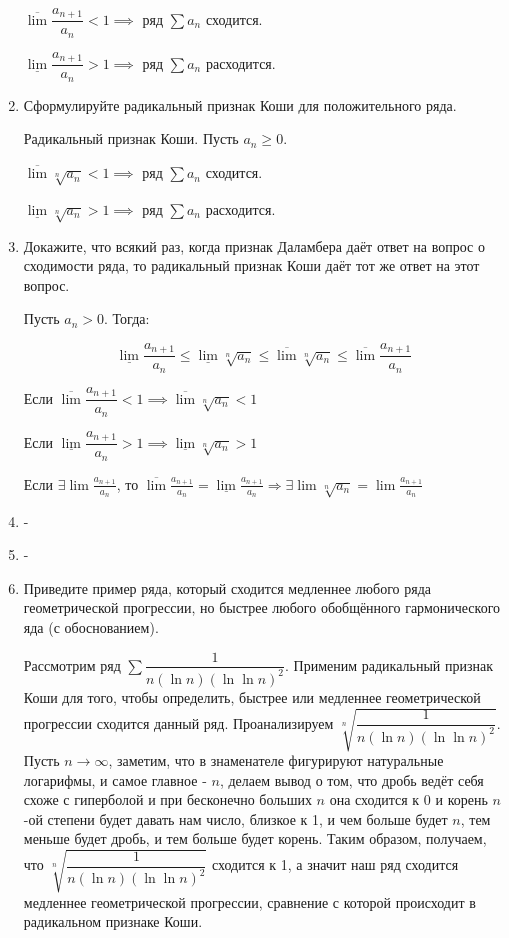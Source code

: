 \documentclass[a4paper]{article}
\begin{document}
\begin{enumerate}
\begin{theorem}
            $\overline{\lim} \dfrac{a_{n+1}}{a_n} < 1 \implies $ ряд $\sum a_n$ сходится.
            
            $\underline{\lim} \dfrac{a_{n+1}}{a_n} > 1 \implies $ ряд $\sum a_n$ расходится.
        \end{theorem}
        \item Сформулируйте радикальный признак Коши для положительного ряда.
        \begin{theorem}
            Радикальный признак Коши. Пусть $a_n \geq 0$.
            
            $\overline{\lim} \sqrt[n]{a_n} < 1 \implies$ ряд $\sum a_n$ сходится.
             
            $\underline{\lim} \sqrt[n]{a_n} > 1 \implies$ ряд $\sum a_n$ расходится.
        \end{theorem}
        \item Докажите, что всякий раз, когда признак Даламбера даёт ответ на вопрос о сходимости ряда, то радикальный признак Коши даёт тот же ответ на этот вопрос.
        
        Пусть $a_n > 0$. Тогда:

        $$ \underline{\lim} \dfrac{a_{n+1}}{a_n} \leq \underline{\lim}{\sqrt[n]{a_n}} \leq \overline{\lim}{\sqrt[n]{a_n}} \leq \overline{\lim}\dfrac{a_{n+1}}{a_n}$$

        Если $\overline{\lim}\dfrac{a_{n+1}}{a_n} < 1 \implies \overline{\lim}{\sqrt[n]{a_n}} < 1$

        Если $\underline{\lim}\dfrac{a_{n+1}}{a_n} > 1 \implies \underline{\lim} \sqrt[n]{a_n} > 1$

        Если $\exists \lim \frac{a_{n+1}}{a_n}$, то $\overline{\lim} \frac{a_{n+1}}{a_n} = \underline{\lim} \frac{a_{n+1}}{a_n} \Rightarrow \exists \lim \sqrt[n]{a_n} = \lim \frac{a_{n+1}}{a_n}$
        \item -
        \item -
        \item Приведите пример ряда, который сходится медленнее любого ряда геометрической прогрессии, но быстрее любого обобщённого гармонического яда (с обоснованием).
        
        Рассмотрим ряд $\sum \dfrac{1}{n (\ln n) (\ln \ln n)^2}$. Применим радикальный признак Коши для того, чтобы определить, быстрее или медленнее геометрической прогрессии сходится данный ряд. Проанализируем $\sqrt[n]{\dfrac{1}{n (\ln n) (\ln \ln n)^2}}$. Пусть $n \rightarrow \infty$, заметим, что в знаменателе фигурируют натуральные логарифмы, и самое главное - $n$, делаем вывод о том, что дробь ведёт себя схоже с гиперболой и при бесконечно больших $n$ она сходится к 0 и корень $n$-ой степени будет давать нам число, близкое к 1, и чем больше будет $n$, тем меньше будет дробь, и тем больше будет корень. Таким образом, получаем, что $\sqrt[n]{\dfrac{1}{n (\ln n) (\ln \ln n)^2}}$ сходится к 1, а значит наш ряд сходится медленнее геометрической прогрессии, сравнение с которой происходит в радикальном признаке Коши.
        	

\end{enumerate}
\end{document}
